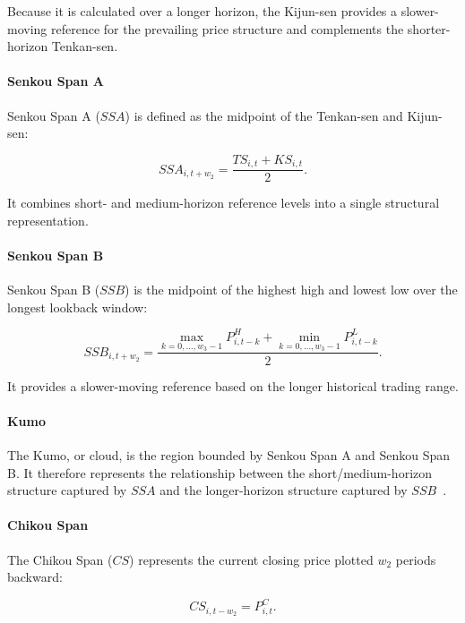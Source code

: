 Because it is calculated over a longer horizon, the Kijun-sen provides a slower-moving reference for the prevailing price structure and complements the shorter-horizon Tenkan-sen.

\paragraph{Senkou Span A}

Senkou Span A ($SSA$) is defined as the midpoint of the Tenkan-sen and Kijun-sen:

\begin{equation}
    SSA_{i,t+w_2}
    =
    \frac{TS_{i,t}+KS_{i,t}}{2}.
\end{equation}

It combines short- and medium-horizon reference levels into a single structural representation.

\paragraph{Senkou Span B}

Senkou Span B ($SSB$) is the midpoint of the highest high and lowest low over the longest lookback window:

\begin{equation}
    SSB_{i,t+w_2}
    =
    \frac{
    \max_{k=0,\ldots,w_3-1}P_{i,t-k}^{H}
    +
    \min_{k=0,\ldots,w_3-1}P_{i,t-k}^{L}
    }{2}.
\end{equation}

It provides a slower-moving reference based on the longer historical trading range.

\paragraph{Kumo}

The Kumo, or cloud, is the region bounded by Senkou Span A and Senkou Span B. It therefore represents the relationship between the short/medium-horizon structure captured by $SSA$ and the longer-horizon structure captured by $SSB$~\cite{Cahyadi2012,Deng2021}.

\paragraph{Chikou Span}

The Chikou Span ($CS$) represents the current closing price plotted $w_2$ periods backward:

\begin{equation}
    CS_{i,t-w_2}=P_{i,t}^{C}.
\end{equation}

